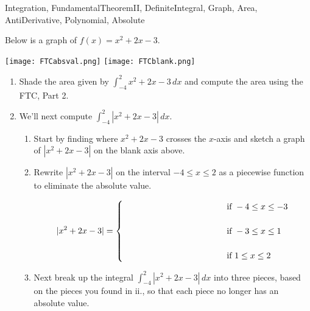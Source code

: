 \begin{tagblock}{Integration, FundamentalTheoremII, DefiniteIntegral, Graph, Area, AntiDerivative, Polynomial, Absolute }
\begin{question}

Below is a graph of $f(x) = x^2+2x-3$.  

 \texttt{[image: FTCabsval.png]} \hspace{1in}  \texttt{[image: FTCblank.png]}

 
 \begin{enumerate}

\item Shade the area given by $\displaystyle \int_{-4}^2 x^2+2x-3 \, dx$ and compute the area using the FTC, Part 2.

\vspace{1in}


\item  We'll next compute   $\displaystyle \int_{-4}^2 |x^2+2x-3| \, dx$.  

\begin{enumerate}
\item Start by finding where  $x^2+2x-3$ crosses the $x$-axis and sketch a graph of $|x^2+2x-3|$ on the blank axis above.  

\vspace{1in}

 
\item  Rewrite  $|x^2+2x-3|$ on the interval $-4 \leq x \leq 2$ as a piecewise function to eliminate the absolute value. 

\[ |x^2+2x-3| = \begin{cases}  \hspace{1.5in} & \text{ if }   -4 \leq x \leq -3\\ \\
 \hspace{1in} & \text{ if }   -3 \leq x \leq 1\\ \\

 \hspace{1in} & \text{ if }   1 \leq x \leq 2 \end{cases}\]

\bigskip

\item Next break up the integral  $\displaystyle \int_{-4}^2 |x^2+2x-3| \, dx$ into three pieces, based on the pieces you found  in ii., so that each piece no longer has an absolute value.  


\end{enumerate}
\end{enumerate}
\end{question}
\end{tagblock}

